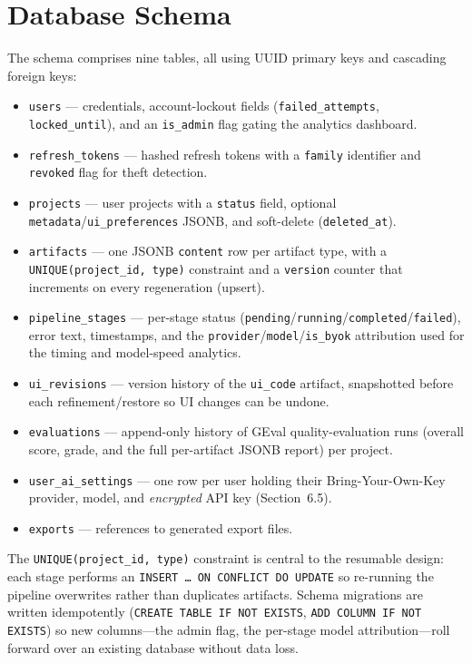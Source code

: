 \documentclass[12pt,a4paper,oneside]{report}
\begin{document}
\section{Database Schema}
The schema comprises nine tables, all using UUID primary keys and cascading foreign keys:
\begin{itemize}[leftmargin=*,nosep]
  \item \texttt{users} --- credentials, account-lockout fields (\texttt{failed\_attempts}, \texttt{locked\_until}), and an \texttt{is\_admin} flag gating the analytics dashboard.
  \item \texttt{refresh\_tokens} --- hashed refresh tokens with a \texttt{family} identifier and \texttt{revoked} flag for theft detection.
  \item \texttt{projects} --- user projects with a \texttt{status} field, optional \texttt{metadata}/\texttt{ui\_preferences} JSONB, and soft-delete (\texttt{deleted\_at}).
  \item \texttt{artifacts} --- one JSONB \texttt{content} row per artifact type, with a \texttt{UNIQUE(project\_id, type)} constraint and a \texttt{version} counter that increments on every regeneration (upsert).
  \item \texttt{pipeline\_stages} --- per-stage status (\texttt{pending}/\texttt{running}/\texttt{completed}/\texttt{failed}), error text, timestamps, and the \texttt{provider}/\texttt{model}/\texttt{is\_byok} attribution used for the timing and model-speed analytics.
  \item \texttt{ui\_revisions} --- version history of the \texttt{ui\_code} artifact, snapshotted before each refinement/restore so UI changes can be undone.
  \item \texttt{evaluations} --- append-only history of GEval quality-evaluation runs (overall score, grade, and the full per-artifact JSONB report) per project.
  \item \texttt{user\_ai\_settings} --- one row per user holding their Bring-Your-Own-Key provider, model, and \emph{encrypted} API key (Section~6.5).
  \item \texttt{exports} --- references to generated export files.
\end{itemize}
The \texttt{UNIQUE(project\_id, type)} constraint is central to the resumable design: each stage performs an \texttt{INSERT \ldots\ ON CONFLICT DO UPDATE} so re-running the pipeline overwrites rather than duplicates artifacts. Schema migrations are written idempotently (\texttt{CREATE TABLE IF NOT EXISTS}, \texttt{ADD COLUMN IF NOT EXISTS}) so new columns---the admin flag, the per-stage model attribution---roll forward over an existing database without data loss.
\end{document}
